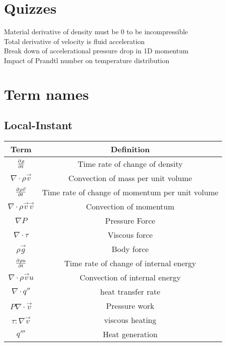 \documentclass{article}
\begin{document}
\section{Quizzes}
Material derivative of density must be 0 to be incompressible\\
Total derivative of velocity is fluid acceleration\\
Break down of accelerational pressure drop  in 1D momentum\\
Impact of Prandtl number on temperature distribution


\section{Term names}

\subsection{Local-Instant}
\begin{table}[!hp!]
    \centering
    \renewcommand{\arraystretch}{1.5}
    \begin{tabular}{|c|c|}
        \hline
        Term & Definition\\
        \toprule
        \bottomrule
        $\frac{\partial^{}\rho}{\partial t^{}}$ & Time rate of change of density  \\
        $\nabla \cdot \rho \Vec{v}$ & Convection of mass per unit volume \\
        $\frac{\partial^{}\rho\Vec{v}}{\partial t^{}}$ & Time rate of change of momentum per unit volume \\
        $\nabla \cdot \rho \Vec{v}\Vec{v}$ & Convection of momentum \\
        $\nabla P$ & Pressure Force \\
        $\nabla \cdot \tau$ & Viscous force \\
        $\rho \Vec{g}$ & Body force \\
        $\frac{\partial^{}\rho u}{\partial t^{}}$ & Time rate of change of internal energy \\
        $\nabla \cdot \rho \Vec{v}u$ & Convection of internal energy\\
        $\nabla \cdot q''$ & heat transfer rate\\
        $ P\nabla\cdot\Vec{v}$ & Pressure work \\
        $ \tau : \nabla\Vec{v}$ & viscous heating \\
        $q'''$ & Heat generation\\
        \hline
    \end{tabular}
\end{table}
\end{document}
